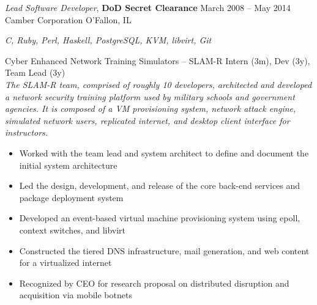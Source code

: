 \documentclass[margin,line]{resume}
\begin{document}
\begin{resume}
{\sl Lead Software Developer}, \textbf{\small DoD Secret Clearance}  \hfill  March 2008 -- May 2014\\
Camber Corporation                                                   \hfill  O'Fallon, IL\\[2pt]
{\small\centering\textit{C, Ruby, Perl, Haskell, PostgreSQL, KVM, libvirt, Git}\par}\vspace*{-\baselineskip}
\vspace{2pt}
{\small Cyber Enhanced Network Training Simulators -- SLAM-R  \hfill  Intern (3m), Dev (3y), Team Lead (3y)}\\
{\small\textit{The SLAM-R team, comprised of roughly 10 developers, architected and developed a network security
training platform used by military schools and government agencies. It is composed of a VM provisioning system, network
attack engine, simulated network users, replicated internet, and desktop client interface for instructors.}}
\begin{itemize} \itemsep -2pt %
\small\item Worked with the team lead and system architect to define and document the initial system architecture
\small\item Led the design, development, and release of the core back-end services and package deployment system
\small\item Developed an event-based virtual machine provisioning system using epoll, context switches, and libvirt
\small\item Constructed the tiered DNS infrastructure, mail generation, and web content for a virtualized internet
\small\item Recognized by CEO for research proposal on distributed disruption and acquisition via mobile botnets

\end{itemize}
\end{resume}
\end{document}
